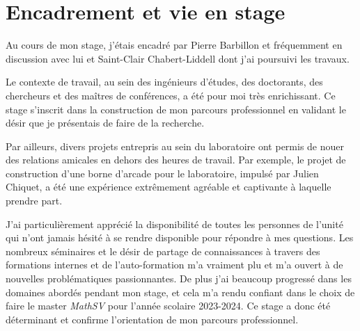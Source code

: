 \section{Encadrement et vie en stage}

Au cours de mon stage, j'étais encadré par Pierre Barbillon et fréquemment en
discussion avec lui et Saint-Clair Chabert-Liddell dont j'ai poursuivi les
travaux.

Le contexte de travail, au sein des ingénieurs d'études, des doctorants, des
chercheurs et des maîtres de conférences, a été pour moi très enrichissant. Ce
stage s'inscrit dans la construction de mon parcours professionnel en validant
le désir que je présentais de faire de la recherche.

Par ailleurs, divers projets entrepris au sein du laboratoire ont permis de
nouer des relations amicales en dehors des heures de travail. Par exemple, le
projet de construction d'une borne d'arcade pour le laboratoire, impulsé par
Julien Chiquet, a été une expérience extrêmement agréable et captivante à
laquelle prendre part.

J'ai particulièrement apprécié la disponibilité de toutes les personnes de
l'unité qui n'ont jamais hésité à se rendre disponible pour répondre à mes
questions.
Les nombreux séminaires et le désir de partage de connaissances à travers des
formations internes et de l'auto-formation m'a vraiment plu et m'a ouvert à de
nouvelles problématiques passionnantes.
De plus j'ai beaucoup progressé dans les domaines abordés pendant mon
stage, et cela m'a rendu confiant dans le choix de faire le
master \emph{MathSV} pour l'année scolaire 2023-2024. Ce stage a donc été
déterminant et confirme l'orientation de mon parcours professionnel.